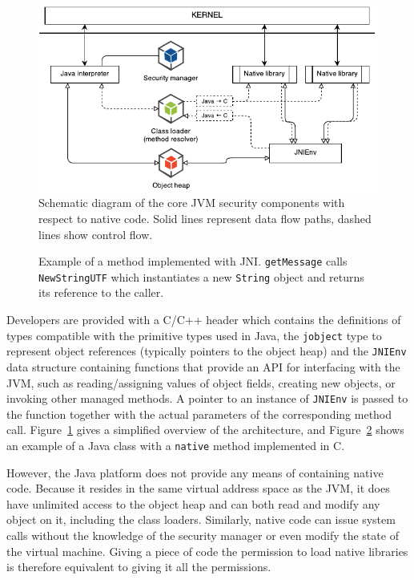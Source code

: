 \documentclass[a4paper,12pt,twoside,openright]{report}
\begin{document}
\begin{figure}
	\includegraphics[width=\textwidth]{dia_jni_orig.pdf}
	\caption{Schematic diagram of the core JVM security components with respect to native code. Solid lines represent data flow paths, dashed lines show control flow.}
	\label{fig:OverviewJNI}
\end{figure}

\begin{figure}[t]
	
	
	\caption{Example of a method implemented with JNI. \texttt{getMessage} calls \texttt{NewStringUTF} which instantiates a new \texttt{String} object and returns its reference to the caller.}
	\label{listing:HelloJNI}
\end{figure}

Developers are provided with a C/C++ header which contains the definitions of types compatible with the primitive types used in Java, the \texttt{jobject} type to represent object references (typically pointers to the object heap) and the \texttt{JNIEnv} data structure containing functions that provide an API for interfacing with the JVM, such as reading/assigning values of object fields, creating new objects, or invoking other managed methods. A pointer to an instance of \texttt{JNIEnv} is passed to the function together with the actual parameters of the corresponding method call. Figure~\ref{fig:OverviewJNI} gives a simplified overview of the architecture, and Figure~\ref{listing:HelloJNI} shows an example of a Java class with a \texttt{native} method implemented in C.

However, the Java platform does not provide any means of containing native code. Because it resides in the same virtual address space as the JVM, it does have unlimited access to the object heap and can both read and modify any object on it, including the class loaders. Similarly, native code can issue system calls without the knowledge of the security manager or even modify the state of the virtual machine. Giving a piece of code the permission to load native libraries is therefore equivalent to giving it all the permissions.
\end{document}
